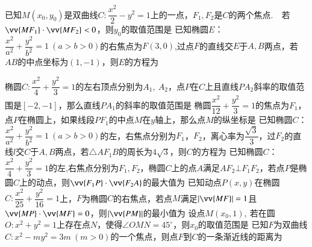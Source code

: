 \documentclass{BHCexam}
\begin{document}
\begin{questions}
\question
已知$M\left(x_0,y_0\right)$是双曲线$C:\dfrac{x^2}{2}-y^2=1$上的一点，$F_1,F_2$是$C$的两个焦点.~~若$\vv{MF_1}\cdot\vv{MF_2}<0$，则$y_0$的取值范围是\xx
{}
\question
已知椭圆$E$：$\dfrac{x^2}{a^2}+\dfrac{y^2}{b^2}=1~(a>b>0)$的右焦点为$F(3,0)$,过点$F$的直线交$E$于$A,B$两点，若$AB$的中点坐标为$(1,-1)$，则$E$的方程为\xx
{}

\qs 椭圆$ C:\dfrac{x^2}{4}+\dfrac{y^2}{3}=1 $的左右顶点分别为$ A_1,~A_2 $，点$ P $在$ C $上且直线$ PA_2 $斜率的取值范围是$ \left[-2,-1\right] $，那么直线$ PA_1 $的斜率的取值范围是\xx
{}
\qs 椭圆$ \dfrac{x^2}{12}+\dfrac{y^2}{3}=1 $的焦点为$ F_1 $，点$ P $在椭圆上，如果线段$ PF_1 $的中点$ M $在$y$轴上，那么点$ M $的纵坐标是\xx
{}
\qs
已知椭圆$C$：$\dfrac{x^2}{a^2}+\dfrac{y^2}{b^2}=1~(a>b>0)$的左，右焦点分别为$F_1$，$F_2$，离心率为$\dfrac{\sqrt{3}}{3}$，过$F_2$的直线$l$交$C$于$A,B$两点，若$\triangle AF_1B$的周长为$4\sqrt{3}$，则$C$的方程为\xx
{}
\qs
已知椭圆$C$：$\dfrac{x^2}{4}+\dfrac{y^2}{3}=1$的左,右焦点分别为$F_1,F_2$，椭圆$C$上的点$A$满足$AF_2\bot F_1F_2$，若点$P$是椭圆$C$上的动点，则$\vv{F_1P}\cdot\vv{F_2A}$的最大值为\xx  
{}
\qs 已知动点$ P(x,y) $在椭圆$ C:\dfrac{x^2}{25}+\dfrac{y^2}{16}=1 $上，$ F $为椭圆$ C $的右焦点，若点$ M $满足$ \left|\vv{MF}\right|=1 $且$\vv{MP}\cdot\vv{MF}=0  $，则$ \left|\vv{PM}\right| $的最小值为\xx
{}
\qs 设点$ M(x_0,1),~ $若在圆$ O: x^2+y^2=1 $上存在点$ N $，使得$ \angle OMN=45^{\circ} $，则$ x_0 $的取值范围是\xx
{}
\qs 已知$ F $为双曲线$ C:x^2-my^2=3m~(m>0)$的一个焦点，则点$ F $到$ C $的一条渐近线的距离为\xx

\end{questions}
\end{document}
